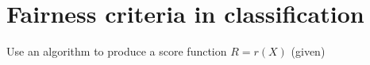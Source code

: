 



\section{Fairness criteria in classification}
Use an algorithm to produce a score function $R=r(X)$ (given)










